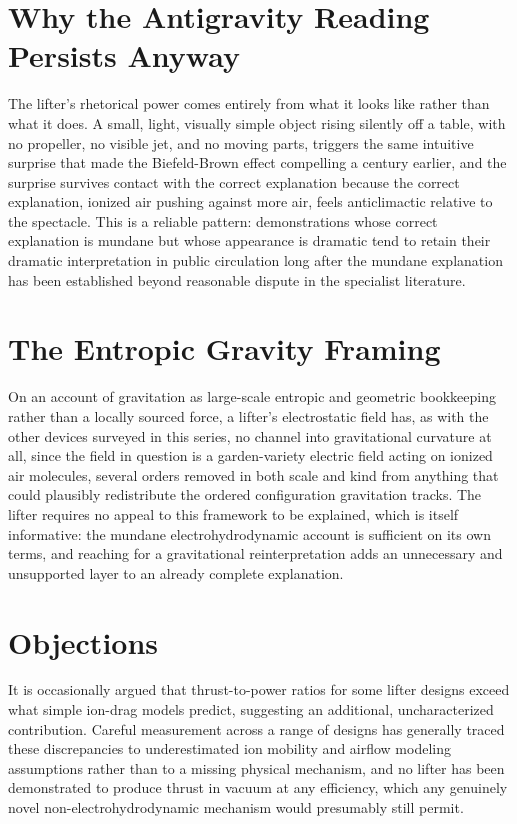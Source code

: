 \documentclass[11pt]{article}
\begin{document}
\section{Why the Antigravity Reading Persists Anyway}

The lifter's rhetorical power comes entirely from what it looks like rather than what it does. A small, light, visually simple object rising silently off a table, with no propeller, no visible jet, and no moving parts, triggers the same intuitive surprise that made the Biefeld-Brown effect compelling a century earlier, and the surprise survives contact with the correct explanation because the correct explanation, ionized air pushing against more air, feels anticlimactic relative to the spectacle. This is a reliable pattern: demonstrations whose correct explanation is mundane but whose appearance is dramatic tend to retain their dramatic interpretation in public circulation long after the mundane explanation has been established beyond reasonable dispute in the specialist literature.

\section{The Entropic Gravity Framing}

On an account of gravitation as large-scale entropic and geometric bookkeeping rather than a locally sourced force, a lifter's electrostatic field has, as with the other devices surveyed in this series, no channel into gravitational curvature at all, since the field in question is a garden-variety electric field acting on ionized air molecules, several orders removed in both scale and kind from anything that could plausibly redistribute the ordered configuration gravitation tracks. The lifter requires no appeal to this framework to be explained, which is itself informative: the mundane electrohydrodynamic account is sufficient on its own terms, and reaching for a gravitational reinterpretation adds an unnecessary and unsupported layer to an already complete explanation.

\section{Objections}

It is occasionally argued that thrust-to-power ratios for some lifter designs exceed what simple ion-drag models predict, suggesting an additional, uncharacterized contribution. Careful measurement across a range of designs has generally traced these discrepancies to underestimated ion mobility and airflow modeling assumptions rather than to a missing physical mechanism, and no lifter has been demonstrated to produce thrust in vacuum at any efficiency, which any genuinely novel non-electrohydrodynamic mechanism would presumably still permit.
\end{document}
